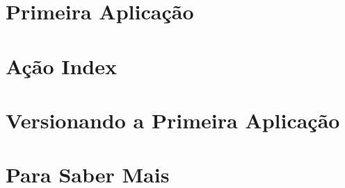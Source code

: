 \documentclass[t, 				             
			   final,
			   12pt, 				         
			   xcolor={usenames,dvipsnames}, 
			   table]{beamer}
\begin{document}
	
	
	  	

    \section{Primeira Aplicação}
    
    
    
    \section{Ação Index}
	
    
    

    \section{Versionando a Primeira Aplicação}
    
        
    
    
    \section{Para Saber Mais}
	
\end{document}
